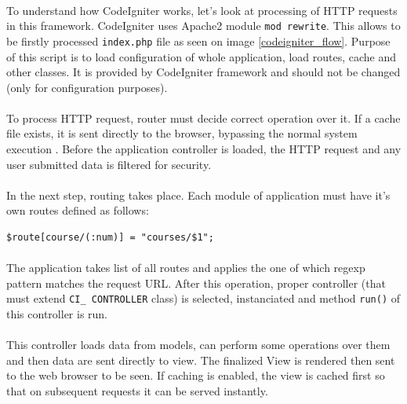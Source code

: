 \paragraph{}
To understand how CodeIgniter works, let's look at processing of HTTP requests in this framework. CodeIgniter uses Apache2  module \texttt{mod rewrite}. This allows to be firstly processed \texttt{index.php} file as seen on image \ref{codeigniter_flow}. Purpose of this script is to load configuration of whole application, load routes, cache and other classes. It is provided by CodeIgniter framework and should not be changed (only for configuration purposes).

\paragraph{}
To process HTTP request, router must decide correct operation over it. If a cache file exists, it is sent directly to the browser, bypassing the normal system execution \cite{codeigniter}. Before the application controller is loaded, the HTTP request and any user submitted data is filtered for security.

\paragraph{}
In the next step, routing takes place. Each module of application must have it's own routes defined as follows:

\begin{lstlisting}[basicstyle=\small,caption={CodeIgniter routing}]
$route[course/(:num)] = "courses/$1";
\end{lstlisting}

\paragraph{}
The application takes list of all routes and applies the one of which regexp pattern matches the request URL. After this operation, proper controller (that must extend \texttt{CI\_ CONTROLLER} class) is selected, instanciated and method \texttt{run()} of this controller is run.

\paragraph{}
This controller loads data from models, can perform some operations over them and then data are sent directly to view. The finalized View is rendered then sent to the web browser to be seen. If caching is enabled, the view is cached first so that on subsequent requests it can be served instantly.

